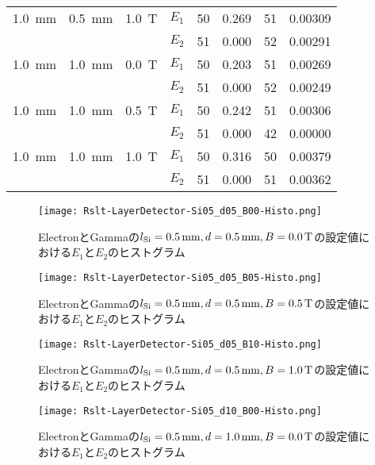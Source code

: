 \documentclass[a4paper,10pt]{jreport}
\begin{document}
\begin{table}[H]
\begin{tabular}{ccc|c|cc|cc}
		\hline
		\SI{1.0}{mm} & \SI{0.5}{mm} & \SI{1.0}{T} & $E_1$ & 50 & 0.269 & 51 & 0.00309 \\
		  &  &  & $E_2$ & 51 & 0.000 & 52 & 0.00291 \\
		\hline
		\SI{1.0}{mm} & \SI{1.0}{mm} & \SI{0.0}{T} & $E_1$ & 50 & 0.203 & 51 & 0.00269 \\
		  &  &  & $E_2$ & 51 & 0.000 & 52 & 0.00249 \\
		\hline
		\SI{1.0}{mm} & \SI{1.0}{mm} & \SI{0.5}{T} & $E_1$ & 50 & 0.242 & 51 & 0.00306 \\
		  &  &  & $E_2$ & 51 & 0.000 & 42 & 0.00000 \\
		\hline
		\SI{1.0}{mm} & \SI{1.0}{mm} & \SI{1.0}{T} & $E_1$ & 50 & 0.316 & 50 & 0.00379 \\
		  &  &  & $E_2$ & 51 & 0.000 & 51 & 0.00362 \\
		\hline
	\end{tabular}
\end{table}

\begin{figure}[H]
	\center
	\texttt{[image: Rslt-LayerDetector-Si05\_d05\_B00-Histo.png]}
	\caption{ElectronとGammaの$l_{\rm{Si}}=\SI{0.5}{mm}, d=\SI{0.5}{mm}, B=\SI{0.0}{T}$の設定値における$E_1$と$E_2$のヒストグラム}
	\label{Rslt-LayerDetector-Si05_d05_B00-Histo}
\end{figure}

\begin{figure}[H]
	\center
	\texttt{[image: Rslt-LayerDetector-Si05\_d05\_B05-Histo.png]}
	\caption{ElectronとGammaの$l_{\rm{Si}}=\SI{0.5}{mm}, d=\SI{0.5}{mm}, B=\SI{0.5}{T}$の設定値における$E_1$と$E_2$のヒストグラム}
	\label{Rslt-LayerDetector-Si05_d05_B05-Histo}
\end{figure}

\begin{figure}[H]
	\center
	\texttt{[image: Rslt-LayerDetector-Si05\_d05\_B10-Histo.png]}
	\caption{ElectronとGammaの$l_{\rm{Si}}=\SI{0.5}{mm}, d=\SI{0.5}{mm}, B=\SI{1.0}{T}$の設定値における$E_1$と$E_2$のヒストグラム}
	\label{Rslt-LayerDetector-Si05_d05_B10-Histo}
\end{figure}

\begin{figure}[H]
	\center
	\texttt{[image: Rslt-LayerDetector-Si05\_d10\_B00-Histo.png]}
	\caption{ElectronとGammaの$l_{\rm{Si}}=\SI{0.5}{mm}, d=\SI{1.0}{mm}, B=\SI{0.0}{T}$の設定値における$E_1$と$E_2$のヒストグラム}
	\label{Rslt-LayerDetector-Si05_d10_B00-Histo}
\end{figure}
\end{document}
